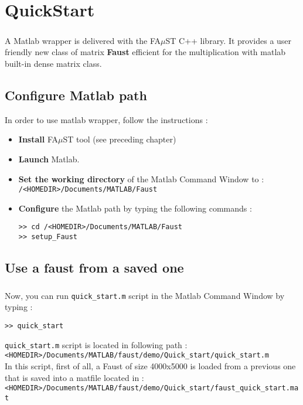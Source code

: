 \chapter{QuickStart}\label{sec:firstUse}


\paragraph{}A Matlab wrapper is delivered with the FA$\mu$ST C++ library.
It provides a user friendly new class of matrix \textbf{Faust} efficient for the multiplication with matlab built-in dense matrix class.\newline

\section{Configure Matlab path}\label{sec:firstUseMatlabPath}
In order to use matlab wrapper, follow the instructions :
\begin{itemize}
\item \textbf{Install} FA$\mu$ST tool (see preceding chapter)
\item \textbf{Launch} Matlab.
\item \textbf{Set the working directory} of the Matlab Command Window to :\\
\texttt{/<HOMEDIR>/Documents/MATLAB/Faust}
\item \textbf{Configure} the Matlab path by typing the following commands :
\begin{lstlisting}
>> cd /<HOMEDIR>/Documents/MATLAB/Faust
>> setup_Faust
\end{lstlisting}

\end{itemize}

\section{Use a faust from a saved one}\label{sec:firstUseBuildFromSave}
\paragraph{} Now, you can run \texttt{quick\_start.m} script in the Matlab Command Window by typing :
\begin{lstlisting}
>> quick_start
\end{lstlisting}
\texttt{quick\_start.m} script is located in following path :\\
\texttt{<HOMEDIR>/Documents/MATLAB/faust/demo/Quick\_start/quick\_start.m} \\
In this script, first of all, a Faust of size 4000x5000 is loaded from a previous one that is saved into a matfile located in :\\
\texttt{<HOMEDIR>/Documents/MATLAB/faust/demo/Quick\_start/faust\_quick\_start.mat}

\newpage
